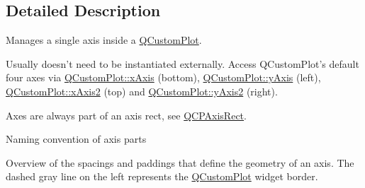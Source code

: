 \subsection{\-Detailed \-Description}
\-Manages a single axis inside a \hyperlink{classQCustomPlot}{\-Q\-Custom\-Plot}. 

\-Usually doesn't need to be instantiated externally. \-Access \-Q\-Custom\-Plot's default four axes via \hyperlink{classQCustomPlot_a9a79cd0158a4c7f30cbc702f0fd800e4}{\-Q\-Custom\-Plot\-::x\-Axis} (bottom), \hyperlink{classQCustomPlot_af6fea5679725b152c14facd920b19367}{\-Q\-Custom\-Plot\-::y\-Axis} (left), \hyperlink{classQCustomPlot_ada41599f22cad901c030f3dcbdd82fd9}{\-Q\-Custom\-Plot\-::x\-Axis2} (top) and \hyperlink{classQCustomPlot_af13fdc5bce7d0fabd640f13ba805c0b7}{\-Q\-Custom\-Plot\-::y\-Axis2} (right).

\-Axes are always part of an axis rect, see \hyperlink{classQCPAxisRect}{\-Q\-C\-P\-Axis\-Rect}.  \begin{center}\-Naming convention of axis parts\end{center}  \par


 \begin{center}\-Overview of the spacings and paddings that define the geometry of an axis. \-The dashed gray line on the left represents the \hyperlink{classQCustomPlot}{\-Q\-Custom\-Plot} widget border.\end{center}  

